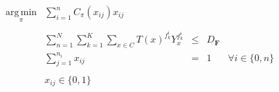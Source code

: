 \begin{equation}
\begin{array} {lllrrr} 
\displaystyle \operatorname*{arg\,min}_\pi & \displaystyle\sum_{i = 1}^n C_{\pi}(x_{ij})x_{ij} \\\\
& \displaystyle\sum_{n = 1}^N \sum_{k = 1}^K \sum_{x \in C} T(x)^{f_k^i} Y_x^{f_k^i} & \leq &  D_{\textbf{F}} \\
& \displaystyle\sum_{j = 1}^{n_i} x_{ij} & = & 1 & \forall i \in \lbrace 0, n \rbrace \\\\
& x_{ij} \in \lbrace 0, 1 \rbrace &&
\end{array}
\end{equation}
















